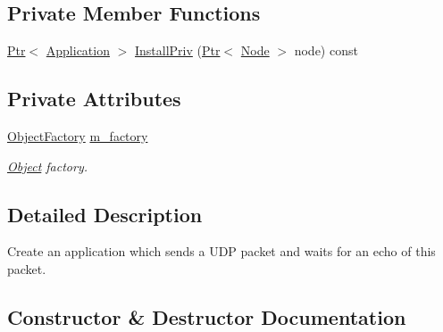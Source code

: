 \subsection*{Private Member Functions}
\begin{DoxyCompactItemize}
\item 
\hyperlink{classns3_1_1Ptr}{Ptr}$<$ \hyperlink{classns3_1_1Application}{Application} $>$ \hyperlink{classns3_1_1UdpEchoClientHelper_a9c2ed5eace3aca363c428dbc867f77ef}{Install\+Priv} (\hyperlink{classns3_1_1Ptr}{Ptr}$<$ \hyperlink{classns3_1_1Node}{Node} $>$ node) const 
\end{DoxyCompactItemize}
\subsection*{Private Attributes}
\begin{DoxyCompactItemize}
\item 
\hyperlink{classns3_1_1ObjectFactory}{Object\+Factory} \hyperlink{classns3_1_1UdpEchoClientHelper_a92b3582c0f3819e09d55ad1f1d885567}{m\+\_\+factory}
\begin{DoxyCompactList}\small\item\em \hyperlink{classns3_1_1Object}{Object} factory. \end{DoxyCompactList}\end{DoxyCompactItemize}


\subsection{Detailed Description}
Create an application which sends a U\+DP packet and waits for an echo of this packet. 

\subsection{Constructor \& Destructor Documentation}
